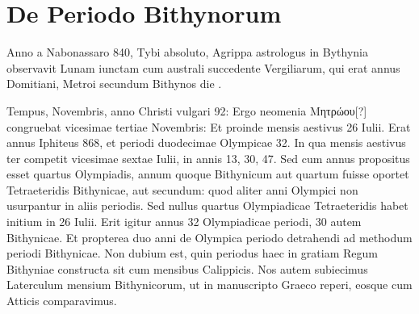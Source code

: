 \section{De Periodo Bithynorum}
Anno a Nabonassaro 840, Tybi  absoluto, Agrippa astrologus
in Bythynia observavit Lunam iunctam cum australi succedente
Vergiliarum, qui erat annus  Domitiani, Metroi
secundum Bithynos die .
\begin{table}[htbp]
  
\end{table}
Tempus,  Novembris, anno
Christi vulgari 92:
Ergo neomenia \textgreek{Μητρώου[?]} congruebat vicesimae tertiae
Novembris:
Et proinde mensis aestivus 26 Iulii.
Erat annus Iphiteus
868, et periodi duodecimae Olympicae
32.
In qua mensis aestivus ter competit
vicesimae sextae Iulii, in annis 13, 30, 47.
Sed cum annus propositus esset quartus Olympiadis,
annum quoque Bithynicum
aut quartum fuisse oportet Tetraeteridis Bithynicae,
aut secundum: quod aliter anni
Olympici non usurpantur in aliis periodis.
Sed nullus quartus Olympiadicae Tetraeteridis
habet initium in 26 Iulii.
Erit igitur
annus 32 Olympiadicae periodi, 30 autem
Bithynicae.
%
Et propterea duo anni de Olympica periodo detrahendi ad
methodum periodi Bithynicae.
Non dubium est, quin periodus haec
in gratiam Regum Bithyniae constructa sit cum mensibus Calippicis.
Nos autem subiecimus Laterculum mensium Bithynicorum, ut in
manuscripto Graeco reperi, eosque cum Atticis comparavimus.
